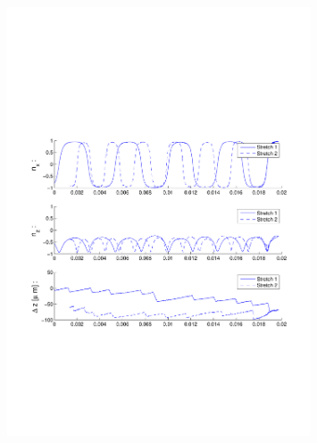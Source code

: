 \begin{figure}[H]

\centering

\includegraphics[width=0.8\textwidth]{Images/Particle 6/Stretch1.pdf}

\end{figure}

